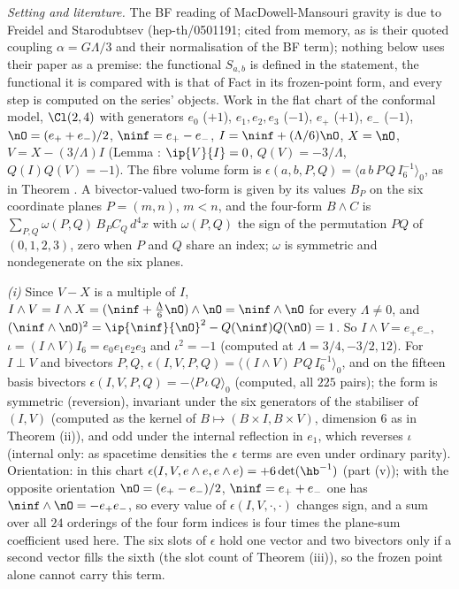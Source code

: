 \emph{Setting and literature.} The BF reading of MacDowell-Mansouri gravity is due to Freidel and Starodubtsev (hep-th/0501191; cited from memory, as is their quoted coupling $\alpha = G\Lambda/3$ and their normalisation of the BF term); nothing below uses their paper as a premise: the functional $S_{a,b}$ is defined in the statement, the functional it is compared with is that of Fact  in its frozen-point form, and every step is computed on the series' objects. Work in the flat chart of the conformal model, $\Cl(2,4)$ with generators $e_{0}$ ($+1$), $e_{1}, e_{2}, e_{3}$ ($-1$), $e_{+}$ ($+1$), $e_{-}$ ($-1$), $\nO = (e_{+} + e_{-})/2$, $\ninf = e_{+} - e_{-}$, $I = \ninf + (\Lambda/6)\nO$, $X = \nO$, $V = X - (3/\Lambda)I$ (Lemma : $\ip{V}{I} = 0$, $Q(V) = -3/\Lambda$, $Q(I)Q(V) = -1$). The fibre volume form is $\epsilon(a, b, P, Q) = \langle a\,b\,P\,Q\,I_{6}^{-1}\rangle_{0}$, as in Theorem . A bivector-valued two-form is given by its values $B_{P}$ on the six coordinate planes $P = (m, n)$, $m < n$, and the four-form $B \wedge C$ is $\sum_{P, Q}\omega(P, Q)\,B_{P}C_{Q}\,d^{4}x$ with $\omega(P, Q)$ the sign of the permutation $P Q$ of $(0,1,2,3)$, zero when $P$ and $Q$ share an index; $\omega$ is symmetric and nondegenerate on the six planes.

\emph{(i)} Since $V - X$ is a multiple of $I$, $I \wedge V = I \wedge X = (\ninf + \tfrac{\Lambda}{6}\nO)\wedge\nO = \ninf\wedge\nO$ for every $\Lambda \neq 0$, and $(\ninf \wedge \nO)^{2} = \ip{\ninf}{\nO}^{2} - Q(\ninf)Q(\nO) = 1$. So $I \wedge V = e_{+}e_{-}$, $\iota = (I\wedge V)I_{6} = e_{0}e_{1}e_{2}e_{3}$ and $\iota^{2} = -1$ (computed at $\Lambda = 3/4, -3/2, 12$). For $I \perp V$ and bivectors $P, Q$, $\epsilon(I, V, P, Q) = \langle (I\wedge V)\,P\,Q\,I_{6}^{-1}\rangle_{0}$, and on the fifteen basis bivectors $\epsilon(I, V, P, Q) = -\langle P\,\iota\,Q\rangle_{0}$ (computed, all $225$ pairs); the form is symmetric (reversion), invariant under the six generators of the stabiliser of $(I, V)$ (computed as the kernel of $B \mapsto (B\times I, B\times V)$, dimension $6$ as in Theorem (ii)), and odd under the internal reflection in $e_{1}$, which reverses $\iota$ (internal only: as spacetime densities the $\epsilon$ terms are even under ordinary parity). Orientation: in this chart $\epsilon(I, V, e\wedge e, e\wedge e) = +6\det(\hb^{-1})$ (part (v)); with the opposite orientation $\nO = (e_{+} - e_{-})/2$, $\ninf = e_{+} + e_{-}$ one has $\ninf\wedge\nO = -e_{+}e_{-}$, so every value of $\epsilon(I, V, \cdot, \cdot)$ changes sign, and a sum over all $24$ orderings of the four form indices is four times the plane-sum coefficient used here. The six slots of $\epsilon$ hold one vector and two bivectors only if a second vector fills the sixth (the slot count of Theorem (iii)), so the frozen point alone cannot carry this term.

